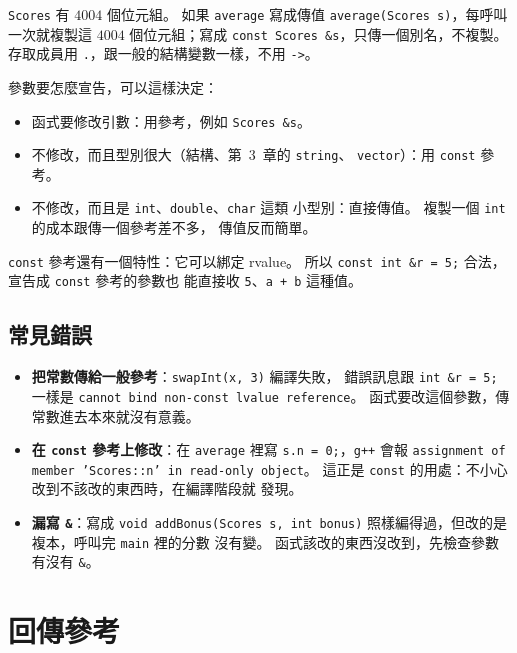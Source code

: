 
\texttt{Scores} 有 $4004$ 個位元組。 如果 \texttt{average} 寫成傳值
\texttt{average(Scores s)}，每呼叫一次就複製這 $4004$ 個位元組；寫成
\texttt{const Scores \&s}，只傳一個別名，不複製。 存取成員用
\texttt{.}，跟一般的結構變數一樣，不用 \texttt{->}。

參數要怎麼宣告，可以這樣決定：

\begin{itemize}
\item 函式要修改引數：用參考，例如 \texttt{Scores \&s}。
\item 不修改，而且型別很大（結構、第~3~章的 \texttt{string}、
\texttt{vector}）：用 \texttt{const} 參考。
\item 不修改，而且是 \texttt{int}、\texttt{double}、\texttt{char} 這類
小型別：直接傳值。 複製一個 \texttt{int} 的成本跟傳一個參考差不多，
傳值反而簡單。
\end{itemize}

\texttt{const} 參考還有一個特性：它可以綁定 rvalue。 所以
\texttt{const int \&r = 5;} 合法，宣告成 \texttt{const} 參考的參數也
能直接收 \texttt{5}、\texttt{a + b} 這種值。

\subsection{常見錯誤}

\begin{itemize}
\item \textbf{把常數傳給一般參考}：\texttt{swapInt(x, 3)} 編譯失敗，
錯誤訊息跟 \texttt{int \&r = 5;} 一樣是 \texttt{cannot bind non-const
lvalue reference}。 函式要改這個參數，傳常數進去本來就沒有意義。
\item \textbf{在 \texttt{const} 參考上修改}：在 \texttt{average} 裡寫
\texttt{s.n = 0;}，\texttt{g++} 會報 \texttt{assignment of member
'Scores::n' in read-only object}。 這正是 \texttt{const} 的用處：不小心改到不該改的東西時，在編譯階段就
發現。
\item \textbf{漏寫 \texttt{\&}}：寫成 \texttt{void addBonus(Scores s,
int bonus)} 照樣編得過，但改的是複本，呼叫完 \texttt{main} 裡的分數
沒有變。 函式該改的東西沒改到，先檢查參數有沒有 \texttt{\&}。
\end{itemize}

\section{回傳參考}
\label{sec:return-ref}

